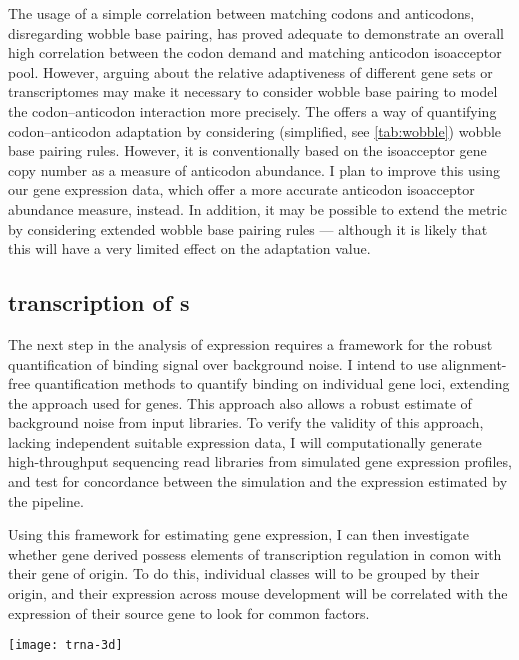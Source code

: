 The usage of a simple correlation between matching codons and anticodons,
disregarding wobble base pairing, has proved adequate to demonstrate an overall
high correlation between the codon demand and matching \trna anticodon
isoacceptor pool. However, arguing about the relative adaptiveness of different
gene sets or transcriptomes may make it  necessary to consider wobble base
pairing to model the codon--anticodon interaction more precisely. The \tai
\citep{Dos_Reis:2003} offers a way of quantifying codon--anticodon adaptation by
considering (simplified, see \cref{tab:wobble}) wobble base pairing rules.
However, it is conventionally based on the \trna isoacceptor gene copy number as
a measure of anticodon abundance. I plan to improve this using our \trna gene
expression data, which offer a more accurate anticodon isoacceptor abundance
measure, instead. In addition, it may be possible to extend the \tai metric by
considering extended wobble base pairing rules \citep{Murphy:2004} --- although
it is likely that this will have a very limited effect on the adaptation value.

\subsection{ transcription of s}

The next step in the analysis of \transsine expression requires a framework for
the robust quantification of  binding signal over background noise. I
intend to use alignment-free quantification methods \citep{Patro:2014,Bray:2015}
to quantify  binding on individual gene loci, extending the approach used
for \trna genes. This approach also allows a robust estimate of background noise
from \chip input libraries. To verify the validity of this approach, lacking
independent suitable \transsine expression data, I will computationally generate
high-throughput sequencing read libraries from simulated \transsine gene
expression profiles, and test for concordance between the simulation and the
expression estimated by the pipeline.

Using this framework for estimating \transsine gene expression, I can then
investigate whether \trna gene derived \transsine[s] possess elements of
transcription regulation in comon with their \trna gene of origin. To do this,
individual \transsine classes will to be grouped by their origin, and their
expression across mouse development will be correlated with the expression of
their source \trna gene to look for common factors.

\clearpage

\begin{center}
    \vspace*{\fill}
    \texttt{[image: trna-3d]}
    \vspace*{\fill}
\end{center}
